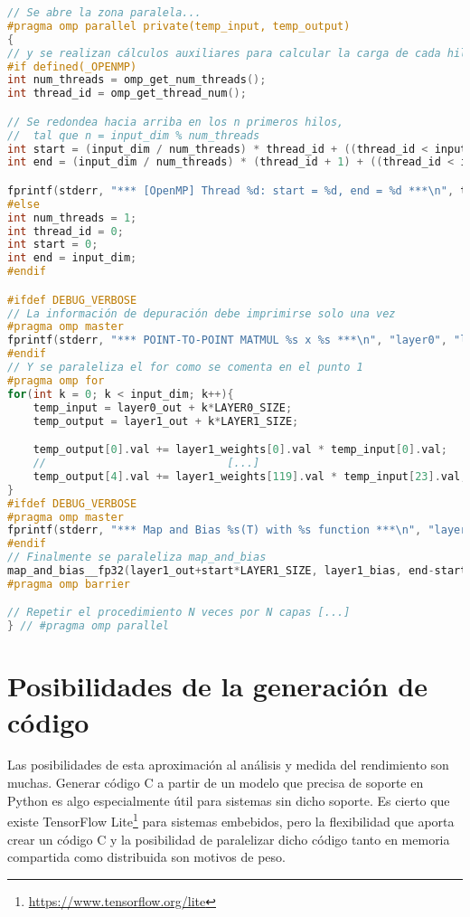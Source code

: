 \begin{enumerate}
\begin{lstlisting}[language=C]
// Se abre la zona paralela...
#pragma omp parallel private(temp_input, temp_output)
{
// y se realizan cálculos auxiliares para calcular la carga de cada hilo
#if defined(_OPENMP)
int num_threads = omp_get_num_threads();
int thread_id = omp_get_thread_num();

// Se redondea hacia arriba en los n primeros hilos,
//  tal que n = input_dim % num_threads
int start = (input_dim / num_threads) * thread_id + ((thread_id < input_dim % num_threads) ? thread_id : input_dim % num_threads);
int end = (input_dim / num_threads) * (thread_id + 1) + ((thread_id < input_dim % num_threads) ? thread_id + 1 : input_dim % num_threads);

fprintf(stderr, "*** [OpenMP] Thread %d: start = %d, end = %d ***\n", thread_id, start, end);
#else
int num_threads = 1;
int thread_id = 0;
int start = 0;
int end = input_dim;
#endif

#ifdef DEBUG_VERBOSE
// La información de depuración debe imprimirse solo una vez
#pragma omp master
fprintf(stderr, "*** POINT-TO-POINT MATMUL %s x %s ***\n", "layer0", "layer1");
#endif
// Y se paraleliza el for como se comenta en el punto 1
#pragma omp for
for(int k = 0; k < input_dim; k++){
    temp_input = layer0_out + k*LAYER0_SIZE;
    temp_output = layer1_out + k*LAYER1_SIZE;

    temp_output[0].val += layer1_weights[0].val * temp_input[0].val;
    //                            [...]
    temp_output[4].val += layer1_weights[119].val * temp_input[23].val;
}
#ifdef DEBUG_VERBOSE
#pragma omp master
fprintf(stderr, "*** Map and Bias %s(T) with %s function ***\n", "layer1_out", "sigmoid__fp32");
#endif
// Finalmente se paraleliza map_and_bias
map_and_bias__fp32(layer1_out+start*LAYER1_SIZE, layer1_bias, end-start, LAYER1_SIZE, 'N', sigmoid__fp32);
#pragma omp barrier

// Repetir el procedimiento N veces por N capas [...]
} // #pragma omp parallel
\end{lstlisting}
\end{enumerate}

\section{Posibilidades de la generación de código}
\label{sec:posibilidades_de_la_generacion_de_codigo}
Las posibilidades de esta aproximación al análisis y medida del rendimiento son muchas. Generar código C a partir de un modelo que precisa de soporte en Python es algo especialmente útil para sistemas sin dicho soporte. Es cierto que existe TensorFlow Lite\footnote{\url{https://www.tensorflow.org/lite}} para sistemas embebidos, pero la flexibilidad que aporta crear un código C y la posibilidad de paralelizar dicho código tanto en memoria compartida como distribuida son motivos de peso.

